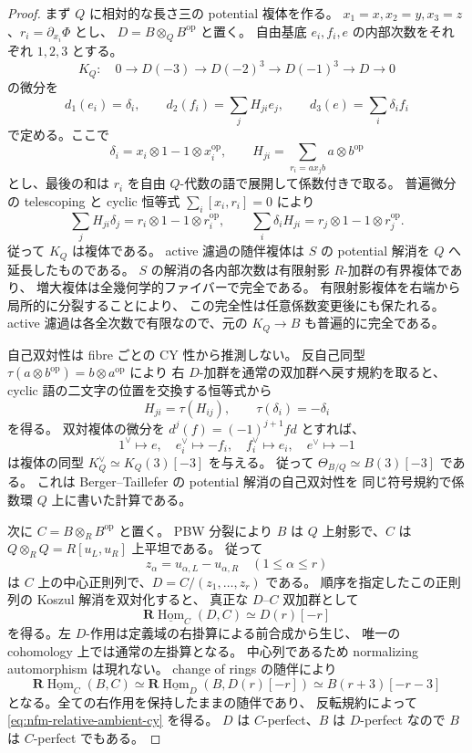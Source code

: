 \begin{proof}
まず $Q$ に相対的な長さ三の potential 複体を作る。
$x_1=x,x_2=y,x_3=z$、$r_i=\partial_{x_i}\Phi$ とし、
$D=B\otimes_QB^{\mathrm{op}}$ と置く。
自由基底 $e_i,f_i,e$ の内部次数をそれぞれ $1,2,3$ とする。
\[
 K_Q:\quad 0\longrightarrow D(-3)\longrightarrow D(-2)^3
 \longrightarrow D(-1)^3\longrightarrow D\longrightarrow0
\]
の微分を
\[
 d_1(e_i)=\delta_i,\qquad
 d_2(f_i)=\sum_jH_{ji}e_j,\qquad
 d_3(e)=\sum_i\delta_i f_i
\]
で定める。ここで
\[
 \delta_i=x_i\otimes1-1\otimes x_i^{\mathrm{op}},\qquad
 H_{ji}=\sum_{r_i=a x_j b}a\otimes b^{\mathrm{op}}
\]
とし、最後の和は $r_i$ を自由 $Q$-代数の語で展開して係数付きで取る。
普遍微分の telescoping と cyclic 恒等式 $\sum_i[x_i,r_i]=0$ により
\[
 \sum_jH_{ji}\delta_j=r_i\otimes1-1\otimes r_i^{\mathrm{op}},\qquad
 \sum_i\delta_iH_{ji}=r_j\otimes1-1\otimes r_j^{\mathrm{op}}.
\]
従って $K_Q$ は複体である。
active 濾過の随伴複体は $S$ の potential 解消を $Q$ へ延長したものである。
$S$ の解消の各内部次数は有限射影 $R$-加群の有界複体であり、
増大複体は全幾何学的ファイバーで完全である。
有限射影複体を右端から局所的に分裂することにより、
この完全性は任意係数変更後にも保たれる。
active 濾過は各全次数で有限なので、元の $K_Q\to B$ も普遍的に完全である。

自己双対性は fibre ごとの CY 性から推測しない。
反自己同型 $\tau(a\otimes b^{\mathrm{op}})=b\otimes a^{\mathrm{op}}$ により
右 $D$-加群を通常の双加群へ戻す規約を取ると、
cyclic 語の二文字の位置を交換する恒等式から
\[
 H_{ji}=\tau(H_{ij}),\qquad \tau(\delta_i)=-\delta_i
\]
を得る。
双対複体の微分を $d^j(f)=(-1)^{j+1}f d$ とすれば、
\[
 1^\vee\mapsto e,\quad e_i^\vee\mapsto-f_i,\quad
 f_i^\vee\mapsto e_i,\quad e^\vee\mapsto-1
\]
は複体の同型 $K_Q^\vee\simeq K_Q(3)[-3]$ を与える。
従って $\Theta_{B/Q}\simeq B(3)[-3]$ である。
これは Berger--Taillefer の potential 解消の自己双対性を
同じ符号規約で係数環 $Q$ 上に書いた計算である。

次に $C=B\otimes_RB^{\mathrm{op}}$ と置く。
PBW 分裂により $B$ は $Q$ 上射影で、$C$ は
$Q\otimes_RQ=R[u_L,u_R]$ 上平坦である。
従って
\[
 z_\alpha=u_{\alpha,L}-u_{\alpha,R}\quad(1\leq\alpha\leq r)
\]
は $C$ 上の中心正則列で、$D=C/(z_1,\ldots,z_r)$ である。
順序を指定したこの正則列の Koszul 解消を双対化すると、
真正な $D$--$C$ 双加群として
\[
 \mathbf R\underline{\operatorname{Hom}}_C(D,C)\simeq D(r)[-r]
\]
を得る。左 $D$-作用は定義域の右掛算による前合成から生じ、
唯一の cohomology 上では通常の左掛算となる。
中心列であるため normalizing automorphism は現れない。
change of rings の随伴により
\[
 \mathbf R\underline{\operatorname{Hom}}_C(B,C)
 \simeq \mathbf R\underline{\operatorname{Hom}}_D
       (B,D(r)[-r])
 \simeq B(r+3)[-r-3]
\]
となる。全ての右作用を保持したままの随伴であり、
反転規約によって \eqref{eq:nfm-relative-ambient-cy} を得る。
$D$ は $C$-perfect、$B$ は $D$-perfect なので $B$ は $C$-perfect でもある。


\end{proof}
